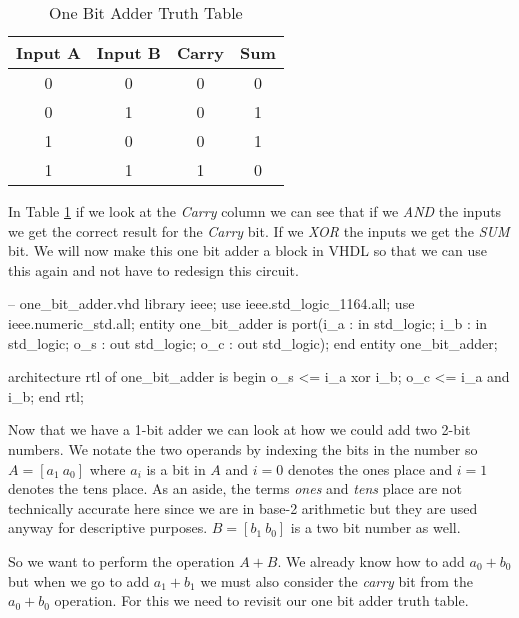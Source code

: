 \begin{table}[h!]  
\begin{center}    
\caption{One Bit Adder Truth Table} 
\label{tab:tt2ba} 
\begin{tabular}{|c|c|c|c|}  
\textbf{Input A} & \textbf{Input B} & \textbf{Carry} & \textbf{Sum}\\  
\hline  
0 & 0 & 0 & 0\\  
0 & 1 & 0 & 1\\  
1 & 0 & 0 & 1\\  
1 & 1 & 1 & 0\\ 
\end{tabular}  
\end{center}
\end{table}
	
In Table \ref{tab:tt2ba} if we look at the \emph{Carry} column we can see that if we \emph{AND} the inputs we get the correct result for the \emph{Carry} bit. If we \emph{XOR} the inputs we get the \emph{SUM} bit. We will now make this one bit adder a block in \ac{VHDL} so that we can use this again and not have to redesign this circuit.

\begin{VHDLlisting}[tabsize=8]
-- one_bit_adder.vhd
library ieee; 
	use ieee.std_logic_1164.all; 
	use ieee.numeric_std.all; 
entity one_bit_adder is
port(i_a : in    std_logic;  
     i_b : in    std_logic;  
	 o_s :   out std_logic;  
	 o_c :   out std_logic);
end entity one_bit_adder;

architecture rtl of one_bit_adder is
begin 
	o_s <= i_a xor i_b; 
	o_c <= i_a and i_b;
end rtl;
\end{VHDLlisting}

Now that we have a 1-bit adder we can look at how we could add two 2-bit numbers. We notate the two operands by indexing the bits in the number so $A=[a_1~a_0]$ where $a_i$ is a bit in $A$ and $i=0$ denotes the ones place and $i=1$ denotes the tens place. As an aside, the terms \emph{ones} and \emph{tens} place are not technically accurate here since we are in base-2 arithmetic but they are used anyway for descriptive purposes. $B=[b_1~b_0]$ is a two bit number as well.

So we want to perform the operation $A+B$. We already know how to add $a_0+b_0$ but when we go to add $a_1+b_1$ we must also consider the \emph{carry} bit from the $a_0+b_0$ operation. For this we need to revisit our one bit adder truth table.

